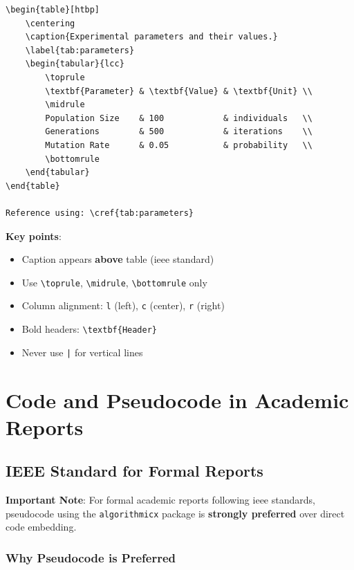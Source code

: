 \begin{verbatim}
\begin{table}[htbp]
    \centering
    \caption{Experimental parameters and their values.}
    \label{tab:parameters}
    \begin{tabular}{lcc}
        \toprule
        \textbf{Parameter} & \textbf{Value} & \textbf{Unit} \\
        \midrule
        Population Size    & 100            & individuals   \\
        Generations        & 500            & iterations    \\
        Mutation Rate      & 0.05           & probability   \\
        \bottomrule
    \end{tabular}
\end{table}

Reference using: \cref{tab:parameters}
\end{verbatim}

\textbf{Key points}:
\begin{itemize}
    \item Caption appears \textbf{above} table (\gls{ieee} standard)
    \item Use \texttt{\textbackslash toprule}, \texttt{\textbackslash midrule}, \texttt{\textbackslash bottomrule} only
    \item Column alignment: \texttt{l} (left), \texttt{c} (center), \texttt{r} (right)
    \item Bold headers: \texttt{\textbackslash textbf\{Header\}}
    \item Never use \texttt{|} for vertical lines
\end{itemize}

\section*{Code and Pseudocode in Academic Reports}

\subsection*{IEEE Standard for Formal Reports}

\textbf{Important Note}: For formal academic reports following \gls{ieee} standards, pseudocode using the \texttt{algorithmicx} package is \textbf{strongly preferred} over direct code embedding.

\subsubsection*{Why Pseudocode is Preferred}

